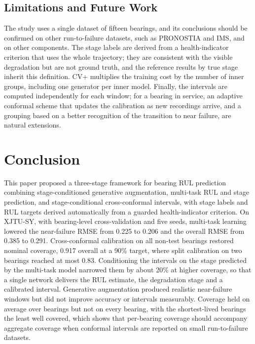 \subsection{Limitations and Future Work}

The study uses a single dataset of fifteen bearings, and its
conclusions should be confirmed on other run-to-failure datasets, such
as PRONOSTIA and IMS, and on other components. The stage labels are
derived from a health-indicator criterion that uses the whole
trajectory; they are consistent with the visible degradation but are
not ground truth, and the reference results by true stage inherit this
definition. CV+ multiplies the training cost by the number of inner
groups, including one generator per inner model. Finally, the intervals
are computed independently for each window; for a bearing in service,
an adaptive conformal scheme that updates the calibration as new
recordings arrive, and a grouping based on a better recognition of the
transition to near failure, are natural extensions.

\section{Conclusion}
\label{sec:conclusion}

This paper proposed a three-stage framework for bearing RUL prediction
combining stage-conditioned generative augmentation, multi-task RUL and
stage prediction, and stage-conditional cross-conformal intervals, with
stage labels and RUL targets derived automatically from a guarded
health-indicator criterion. On XJTU-SY, with bearing-level
cross-validation and five seeds, multi-task learning lowered the
near-failure RMSE from 0.225 to 0.206 and the overall RMSE from 0.385
to 0.291. Cross-conformal calibration on all non-test bearings restored
nominal coverage, 0.917 overall at a 90\% target, where split
calibration on two bearings reached at most 0.83. Conditioning the
intervals on the stage predicted by the multi-task model narrowed them
by about 20\% at higher coverage, so that a single network delivers the
RUL estimate, the degradation stage and a calibrated interval.
Generative augmentation produced realistic near-failure windows but did
not improve accuracy or intervals measurably. Coverage held on average
over bearings but not on every bearing, with the shortest-lived
bearings the least well covered, which shows that per-bearing coverage
should accompany aggregate coverage when conformal intervals are
reported on small run-to-failure datasets.
